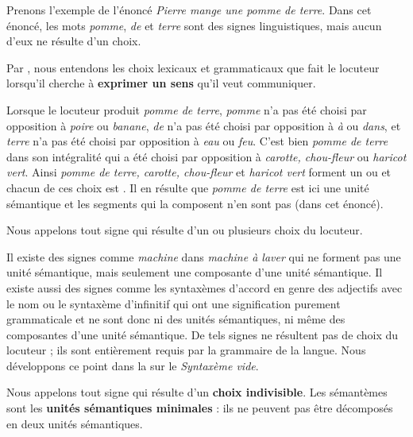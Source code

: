 Prenons l’exemple de l’énoncé \textit{Pierre mange une pomme de terre}. Dans cet énoncé, les mots \textit{pomme}, \textit{de} et \textit{terre} sont des signes linguistiques, mais aucun d’eux ne résulte d’un choix.

\begin{styleLivreImportant}
Par , nous entendons les choix lexicaux et grammaticaux que fait le locuteur lorsqu’il cherche à \textbf{exprimer un sens} qu’il veut communiquer.
\end{styleLivreImportant}

Lorsque le locuteur produit \textit{pomme de terre}, \textit{pomme} n’a pas été choisi par opposition à \textit{poire} ou \textit{banane}, \textit{de} n’a pas été choisi par opposition à \textit{à} ou \textit{dans}, et \textit{terre} n’a pas été choisi par opposition à \textit{eau} ou \textit{feu}. C’est bien \textit{pomme de terre} dans son intégralité qui a été choisi par opposition à \textit{carotte, chou-fleur} ou \textit{haricot vert}. Ainsi \textit{pomme de terre, carotte, chou-fleur} et \textit{haricot vert} forment un  ou  et chacun de ces choix est . Il en résulte que \textit{pomme de terre} est ici une unité sémantique et les segments qui la composent n’en sont pas (dans cet énoncé).

\begin{styleLivreImportant}
Nous appelons  tout signe qui résulte d’un ou plusieurs choix du locuteur.
\end{styleLivreImportant}

Il existe des signes comme \textit{machine} dans \textit{machine à laver} qui ne forment pas une unité sémantique, mais seulement une composante d’une unité sémantique. Il existe aussi des signes comme les syntaxèmes d’accord en genre des adjectifs avec le nom ou le syntaxème d’infinitif qui ont une signification purement grammaticale et ne sont donc ni des unités sémantiques, ni même des composantes d’une unité sémantique. De tels signes ne résultent pas de choix du locuteur ; ils sont entièrement requis par la grammaire de la langue. Nous développons ce point dans la  sur le \textit{Syntaxème vide}.

\begin{styleLivreImportant}
Nous appelons  tout signe qui résulte d’un \textbf{choix indivisible}. Les sémantèmes sont les \textbf{unités sémantiques minimales} : ils ne peuvent pas être décomposés en deux unités sémantiques.
\end{styleLivreImportant}

